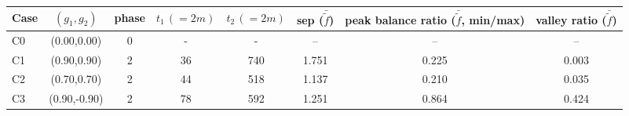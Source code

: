 \begin{tabular}{lccccccc}
\toprule
Case & $(g_1,g_2)$ & phase & $t_1\,(=2m)$ & $t_2\,(=2m)$ & sep ($\bar{\tilde f}$) & peak balance ratio ($\bar{\tilde f}$, min/max) & valley ratio ($\bar{\tilde f}$) \\
\midrule
C0 & (0.00,0.00) & 0 & - & - & -- & -- & -- \\
C1 & (0.90,0.90) & 2 & 36 & 740 & 1.751 & 0.225 & 0.003 \\
C2 & (0.70,0.70) & 2 & 44 & 518 & 1.137 & 0.210 & 0.035 \\
C3 & (0.90,-0.90) & 2 & 78 & 592 & 1.251 & 0.864 & 0.424 \\
\bottomrule
\end{tabular}
